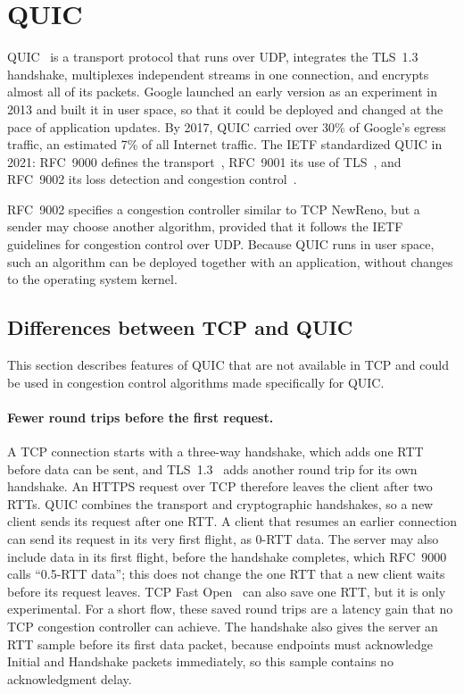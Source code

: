 \section{QUIC}\label{sec:bg-quic}

QUIC~\cite{langley2017quic} is a transport protocol that runs over UDP, integrates the TLS~1.3 handshake,
multiplexes independent streams in one connection, and encrypts almost all of its
packets. Google launched an early version as an experiment in
2013 and built it in user space, so that it could be deployed and changed at the pace
of application updates. By 2017, QUIC carried over 30\% of Google's egress traffic,
an estimated 7\% of all Internet traffic. The IETF standardized
QUIC in 2021: RFC~9000 defines the transport~\cite{rfc9000}, RFC~9001 its use of
TLS~\cite{rfc9001}, and RFC~9002 its loss detection and congestion
control~\cite{rfc9002}.

RFC~9002 specifies a congestion controller similar to TCP NewReno, but a sender may choose another algorithm, provided that it follows
the IETF guidelines for congestion control over UDP. Because QUIC runs
in user space, such an algorithm can be deployed together with an application,
without changes to the operating system kernel.

\subsection{Differences between TCP and QUIC}\label{sec:bg-quic-features}

This section describes features of QUIC that are not available in TCP and could be used in congestion control algorithms made specifically for QUIC.

\paragraph{Fewer round trips before the first request.} A TCP connection starts with
a three-way handshake, which adds one RTT before data can be sent, and
TLS~1.3~\cite{rfc8446} adds another round trip for its own handshake. An HTTPS
request over TCP therefore leaves the client after two RTTs. QUIC combines the
transport and cryptographic handshakes, so a new client sends its
request after one RTT. A client that resumes an earlier connection can send its
request in its very first flight, as 0-RTT data. The server may also
include data in its first flight, before the handshake completes, which RFC~9000
calls ``0.5-RTT data''; this does not change the one RTT that a new
client waits before its request leaves. TCP Fast Open~\cite{rfc7413} can also save one RTT, but it
is only experimental. For a short flow, these saved round trips are a
latency gain that no TCP congestion controller can achieve. The handshake also gives the
server an RTT sample before its first data packet, because endpoints must acknowledge
Initial and Handshake packets immediately, so this sample contains no
acknowledgment delay.

